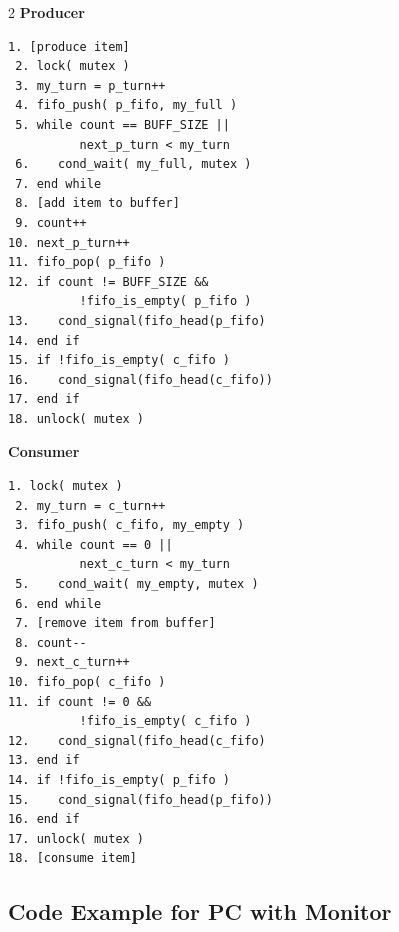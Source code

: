 \begin{multicols}{2}
    \small
    \textbf{Producer}
    \begin{Verbatim}[commandchars=\\\{\}]
 1. [produce item]
 2. lock( mutex )
 3. my_turn = p_turn++
 4. fifo_push( p_fifo, my_full )
 5. while count == BUFF_SIZE ||
          next_p_turn < my_turn
 6.    cond_wait( my_full, mutex )
 7. end while
 8. [add item to buffer]
 9. count++
10. next_p_turn++
11. fifo_pop( p_fifo )
12. if count != BUFF_SIZE &&
          !fifo_is_empty( p_fifo )
13.    cond_signal(fifo_head(p_fifo)
14. end if
15. if !fifo_is_empty( c_fifo )
16.    cond_signal(fifo_head(c_fifo))
17. end if
18. unlock( mutex )
    \end{Verbatim}
    \columnbreak
    \textbf{Consumer}\vspace{-2em}
    \begin{Verbatim}[commandchars=\\\{\}]
 1. lock( mutex )
 2. my_turn = c_turn++
 3. fifo_push( c_fifo, my_empty )
 4. while count == 0 ||
          next_c_turn < my_turn
 5.    cond_wait( my_empty, mutex )
 6. end while
 7. [remove item from buffer]
 8. count--
 9. next_c_turn++
10. fifo_pop( c_fifo )
11. if count != 0 &&
          !fifo_is_empty( c_fifo )
12.    cond_signal(fifo_head(c_fifo)
13. end if
14. if !fifo_is_empty( p_fifo )
15.    cond_signal(fifo_head(p_fifo))
16. end if
17. unlock( mutex )
18. [consume item]
    \end{Verbatim}
\end{multicols}
\vspace{-2em}

\subsection*{Code Example for PC with Monitor}

